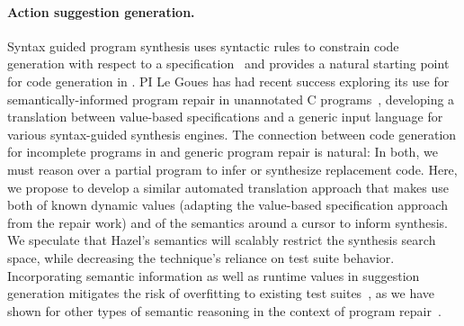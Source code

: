\paragraph{Action suggestion generation.}  Syntax guided program synthesis uses
syntactic rules to constrain code generation with respect to a
specification~\citep{sygus} and provides a natural starting point for
code generation in \Hazel. PI Le Goues has had recent success exploring its use
for semantically-informed program repair in unannotated C
programs~\citep{sygus-icsme-era}, developing a translation between value-based
specifications and a generic input language for various syntax-guided synthesis
engines.  The connection between code generation for incomplete programs in \Hazel
and generic program repair is natural: In both, we must reason over a partial
program to infer or synthesize replacement code.  Here, we propose to develop a
similar automated translation approach that makes use both of known
dynamic values (adapting the value-based specification approach from the repair
work) and of the semantics around a cursor to inform synthesis. We speculate
that Hazel's semantics will scalably restrict the synthesis search space, while
decreasing the technique's reliance on test suite behavior.  Incorporating
semantic information as well as runtime values in suggestion generation mitigates the
risk of overfitting to existing test suites~\citep{Qi13issta,Smith15fse}, as we
have shown for other types of semantic reasoning in the context of program repair~\citep{Ke15ase}.


